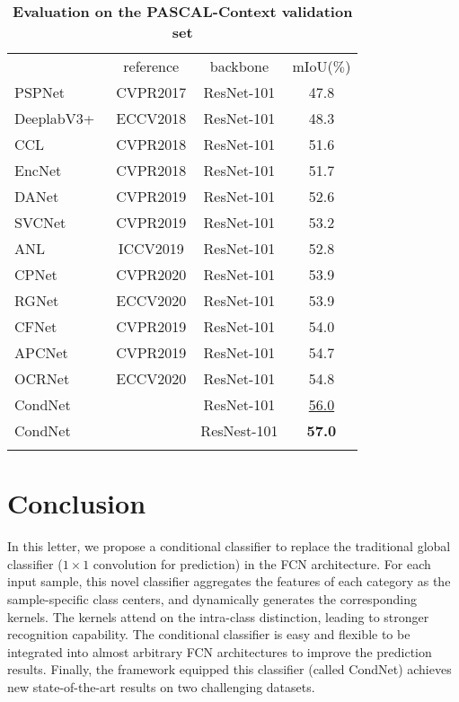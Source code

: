 \documentclass[journal]{IEEEtran}
\begin{document}
\begin{table}[t]
\centering
\setlength{\tabcolsep}{4.0pt}
\small
\renewcommand{\arraystretch}{1.4}
\caption{\textbf{Evaluation on
	the PASCAL-Context validation set}}
\label{tab:pascal_cxt}
\begin{tabular}{l|c|c|c}
\shline
\multicolumn{1}{c|}{model} & reference & backbone & mIoU($\%$) \\ 
\shline
PSPNet~\cite{Zhao-CVPR-PSPNet-2017}    & CVPR2017 & ResNet-101 & 47.8  \\
DeeplabV3+~\cite{Chen-ECCV-Deeplabv3p-2018} & ECCV2018 & ResNet-101 & 48.3 \\
CCL~\cite{Ding-CVPR-CCL-2018}       & CVPR2018 & ResNet-101 & 51.6  \\
EncNet~\cite{Zhang-CVPR-EncNet-2018}    & CVPR2018 & ResNet-101 & 51.7  \\
DANet~\cite{Fu-CVPR-DANet-2019}     & CVPR2019 & ResNet-101 & 52.6  \\
SVCNet~\cite{Ding-CVPR-SVCNet-2019} & CVPR2019 & ResNet-101 & 53.2 \\
ANL~\cite{Zhu-ICCV-ANL-2019}       & ICCV2019 & ResNet-101 & 52.8  \\
CPNet~\cite{Yu-CVPR-CPNet-2020}     & CVPR2020 & ResNet-101 & 53.9 \\
RGNet~\cite{Yu-ECCV-RepGraph-2020}     & ECCV2020 & ResNet-101 & 53.9 \\
CFNet~\cite{Zhang-CVPR-CFNet-2019}     & CVPR2019 & ResNet-101 & 54.0 \\
APCNet~\cite{He-CVPR-APCNet-2019}    & CVPR2019 & ResNet-101 & 54.7 \\
OCRNet~\cite{Yuan-ECCV-OCRNet-2019}    & ECCV2020 & ResNet-101 & 54.8 \\
\hline
CondNet & & ResNet-101  & \underline{56.0} \\
CondNet & & ResNest-101 & \textbf{57.0} \\
\shline	
\end{tabular}
\end{table}	



\section{Conclusion}
In this letter, we propose a conditional classifier 
to replace the traditional global classifier ($1\times1$ convolution for prediction)
in the FCN architecture.
For each input sample, this novel classifier aggregates the features of each category as the sample-specific class centers, and dynamically generates the corresponding kernels.
The kernels attend on the intra-class distinction, leading to stronger recognition capability.
The conditional classifier is easy and flexible to be integrated into almost arbitrary FCN architectures to improve the prediction results.
Finally, the framework equipped this classifier (called CondNet) achieves 
new state-of-the-art results on two challenging datasets.



\clearpage

\ifCLASSOPTIONcaptionsoff
  \newpage
\fi
\newpage


\end{document}
